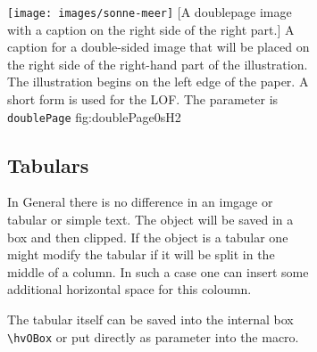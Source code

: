 \documentclass[twoside,paper=a4,usegeometry]{scrartcl}
\makeatletter
\let\hvBlindtext\Blindtext
\def\Blindtext{\par\color{black!40}\hvBlindtext\par\normalcolor}
\def\Lcs#1{\texttt{\textbackslash#1}\index{#1@\texttt{\textbackslash#1}}}
\makeatother
\begin{document}
\begin{figure}[p]
\begin{figure}[p]
\hvFloatSetDefaults

%
  {\texttt{[image: images/sonne-meer]}}%
  [A doublepage image with a caption on the right side of the right part.]%
  {A caption for a double-sided image that will be placed on the right side of the
   right-hand part of the illustration. The illustration begins on the left edge of 
   the paper. A short form is used for the LOF. 
   The parameter is \texttt{doublePage}}%
  {fig:doublePage0sH2}

\Blindtext

\Blindtext

\Blindtext







\subsection{Tabulars}

In General there is no difference in an imgage or tabular or simple text. The object will be saved in a box and
then clipped. If the object is a tabular one might modify the tabular if it will be split in the middle of a
column. In such a case one can insert some additional horizontal space for this coloumn.

The tabular itself can be saved into the internal box \Lcs{hvOBox} or put directly as parameter into the 
macro.



\end{figure}
\end{figure}
\end{document}
